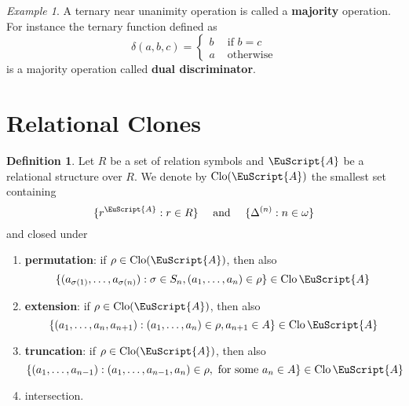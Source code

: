 \documentclass{amsart}
\theoremstyle{plain}
\theoremstyle{definition}
\newtheorem{definition}[theorem]{Definition}
\theoremstyle{remark}
\newtheorem{example}[theorem]{Example}
\DeclareMathOperator{\Clo}{Clo}
\begin{document}
\begin{example}
    \label{dual}
    A ternary near unanimity operation is called a \textbf{majority} operation. 
    For instance the ternary function defined as 
    \begin{equation*}
        \delta(a,b,c) = 
        \begin{cases}
            b & \text{ if } b = c \\
            a & \text{ otherwise}
        \end{cases}
    \end{equation*}
    is a majority operation called \textbf{dual discriminator}. 
\end{example}

\section{Relational Clones} 
\begin{definition}
    Let $R$ be a set of relation symbols and $\EuScript{A}$ be a relational structure over $R$.
    We denote by $\Clo(\EuScript{A})$ the smallest set containing 
    \begin{equation*}
        \{r^\EuScript{A} : r \in R\} \quad \text{ and } \quad \{\Delta^{(n)} : n \in \omega\}
    \end{equation*}
    and closed under 
    \begin{enumerate}
        \item \textbf{permutation}: if $\rho \in \Clo(\EuScript{A})$, then also
        \begin{equation*}
            \{(a_{\sigma(1)}, \ldots, a_{\sigma(n)}) : \sigma \in S_n, (a_1, \ldots, a_n) \in \rho\} \in \Clo{\EuScript{A}}
        \end{equation*} 
        \item \textbf{extension}: if $\rho \in \Clo(\EuScript{A})$, then also
        \begin{equation*}
            \{(a_{1}, \ldots, a_{n}, a_{n+1}) :  (a_1, \ldots, a_n) \in \rho, a_{n+1} \in A\} \in \Clo{\EuScript{A}}
        \end{equation*} 
        \item \textbf{truncation}: if $\rho \in \Clo(\EuScript{A})$, then also
        \begin{equation*}
            \{(a_1, \ldots, a_{n-1}): (a_1, \ldots, a_{n-1}, a_n) \in \rho, \text{ for some } a_n \in A \} \in \Clo{\EuScript{A}}
        \end{equation*}
        \item intersection. 
    \end{enumerate}
\end{definition}
\end{document}
